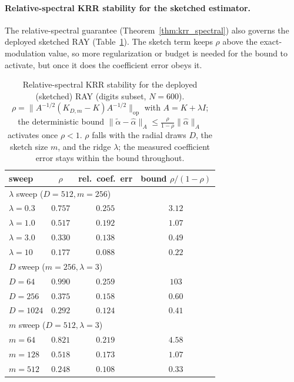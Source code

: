 \documentclass{article}
\begin{document}
\paragraph{Relative-spectral KRR stability for the sketched estimator.} The relative-spectral guarantee (Theorem~\ref{thm:krr_spectral}) also governs the deployed sketched RAY (Table~\ref{tab:krr_sketched}). The sketch term keeps $\rho$ above the exact-modulation value, so more regularization or budget is needed for the bound to activate, but once it does the coefficient error obeys it.

\begin{table}[h]
\centering
\caption{Relative-spectral KRR stability for the deployed (sketched) RAY (digits subset, $N{=}600$). $\rho=\|A^{-1/2}(K_{D,m}-K)A^{-1/2}\|_{\mathrm{op}}$ with $A=K+\lambda I$; the deterministic bound $\|\tilde\alpha-\hat\alpha\|_A\le\frac{\rho}{1-\rho}\|\hat\alpha\|_A$ activates once $\rho<1$. $\rho$ falls with the radial draws $D$, the sketch size $m$, and the ridge $\lambda$; the measured coefficient error stays within the bound throughout.}
\label{tab:krr_sketched}
\begin{tabular}{lccc}
\toprule
sweep & $\rho$ & rel.\ coef.\ err & bound $\rho/(1{-}\rho)$ \\
\midrule
\multicolumn{4}{l}{$\lambda$ sweep ($D{=}512,m{=}256$)} \\
\midrule
$\lambda{=}0.3$ & $0.757$ & $0.255$ & $3.12$ \\
$\lambda{=}1.0$ & $0.517$ & $0.192$ & $1.07$ \\
$\lambda{=}3.0$ & $0.330$ & $0.138$ & $0.49$ \\
$\lambda{=}10$  & $0.177$ & $0.088$ & $0.22$ \\
\midrule
\multicolumn{4}{l}{$D$ sweep ($m{=}256,\lambda{=}3$)} \\
\midrule
$D{=}64$   & $0.990$ & $0.259$ & $103$  \\
$D{=}256$  & $0.375$ & $0.158$ & $0.60$ \\
$D{=}1024$ & $0.292$ & $0.124$ & $0.41$ \\
\midrule
\multicolumn{4}{l}{$m$ sweep ($D{=}512,\lambda{=}3$)} \\
\midrule
$m{=}64$  & $0.821$ & $0.219$ & $4.58$ \\
$m{=}128$ & $0.518$ & $0.173$ & $1.07$ \\
$m{=}512$ & $0.248$ & $0.108$ & $0.33$ \\
\bottomrule
\end{tabular}
\end{table}
\end{document}
